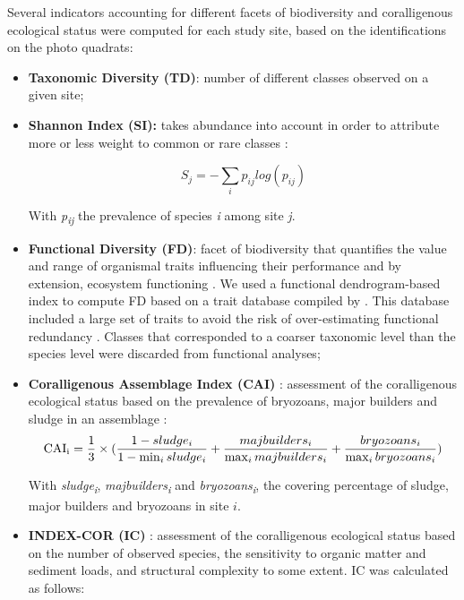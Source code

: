 Several indicators accounting for different facets of biodiversity and coralligenous ecological status were computed for each study site, based on the identifications on the photo quadrats:
\begin{itemize}
    \item \textbf{Taxonomic Diversity (TD)}: number of different classes observed on a given site;
    
    \item \textbf{Shannon Index (SI):} takes abundance into account in order to attribute more or less weight to common or rare classes \citep{magurran_measuring_2004}:
    
    \begin{equation}
	S_j=-\sum_{i}p_{ij} log(p_{ij})
	\label{eq4.1}
    \end{equation}

    With \textit{p\textsubscript{ij}} the prevalence of species \textit{i} among site \textit{j}.

    \item \textbf{Functional Diversity (FD)}: facet of biodiversity that quantifies the value and range of organismal traits influencing their performance and by extension, ecosystem functioning \citep{diaz_vive_2001}. We used a functional dendrogram-based index to compute FD \citep{mouchet_towards_2008} based on a trait database compiled by \citet{doxa_mapping_2016}. This database included a large set of traits to avoid the risk of over-estimating functional redundancy \citep{calba_measuring_2014}. Classes that corresponded to a coarser taxonomic level than the species level were discarded from functional analyses;
    
    \item \textbf{Coralligenous Assemblage Index (CAI)} \citep{deter_preliminary_2012}: assessment of the coralligenous ecological status based on the prevalence of bryozoans, major builders and sludge in an assemblage :
    \begin{equation}
    \text{CAI\textsubscript{i}}=\frac{1}{3}\times(\frac{1-sludge_i}{1-\min_{i}sludge_i}+\frac{majbuilders_i}{\max_{i}majbuilders_i}+\frac{bryozoans_i}{\max_{i}bryozoans_i})
    \label{eq4.2}
    \end{equation}

    With \textit{sludge\textsubscript{i}}, \textit{majbuilders\textsubscript{i}} and \textit{bryozoans\textsubscript{i}}, the covering percentage of sludge, major builders and bryozoans in site $i$.
    
    \item \textbf{INDEX-COR (IC)} \citep{sartoretto_integrated_2017}: assessment of the coralligenous ecological status based on the number of observed species, the sensitivity to organic matter and sediment loads, and structural complexity to some extent. IC was calculated as follows:
    

\end{itemize}
